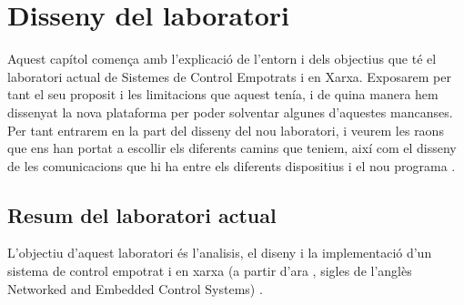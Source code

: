 
\chapter{Disseny del laboratori}\label{cap:dis}


\ifpdf
    \graphicspath{{3_laboratory_design/figures/PNG/}{3_laboratory_design/figures/PDF/}{3_laboratory_design/figures/}}
\else
    \graphicspath{{3_laboratory_design/figures/EPS/}{3_laboratory_design/figures/}}
\fi



Aquest capítol comença amb l'explicació de l'entorn i dels objectius que té el laboratori actual de Sistemes de Control Empotrats i en Xarxa. Exposarem per tant el seu proposit i les limitacions que aquest tenía, i de quina manera hem dissenyat la nova plataforma per poder solventar algunes d'aquestes mancanses.
Per tant entrarem en la part del disseny del nou laboratori, i veurem les raons que ens han portat a escollir els diferents camins que teniem, així com el disseny de les comunicacions que hi ha entre els diferents dispositius i el nou programa \DCSMonitor.

\section{Resum del laboratori actual}\label{cap:dis:resum}

L'objectiu d'aquest laboratori és l'analisis, el diseny i la implementació d'un sistema de control empotrat i en xarxa (a partir d'ara \NECS, sigles de l'anglès Networked and Embedded Control Systems) \cite[laboratori complert en el document \emph{Networked and Embedded Control Systems (NECS) Double Integrator Control Lab}]{NECSDoubInt}.

